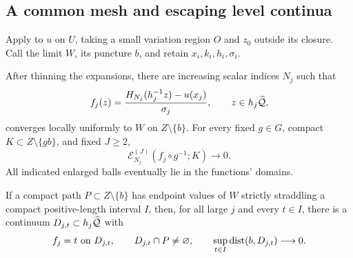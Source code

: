 \subsection{A common mesh and escaping level continua}

Apply  to $u$ on $U$, taking a small
variation region $O$ and $z_0$ outside its closure. Call the limit
$W$, its puncture $b$, and retain $x_i,k_i,h_i,\sigma_i$.

\begin{lemma}
\label{lem:exponential-diagonal}
After thinning the expansions, there are increasing scalar indices
$N_j$ such that
\[
 f_j(z)=\frac{H_{N_j}(h_j^{-1}z)-u(x_j)}{\sigma_j},
 \qquad z\in h_j\widehat{\mathcal Q},
\]
converges locally uniformly to $W$ on $Z\setminus\{b\}$.
For every fixed $g\in G$, compact $K\subset Z\setminus\{gb\}$,
and fixed $J\ge2$,
\begin{equation}
 \mathcal E_{N_j}^{(J)}(f_j\circ g^{-1};K)\longrightarrow0.
 \label{eq:exponential-translated-energy}
\end{equation}
All indicated enlarged balls eventually lie in the functions' domains.

If a compact path $P\subset Z\setminus\{b\}$ has endpoint values
of $W$ strictly straddling a compact positive-length interval $I$,
then, for all large $j$ and every $t\in I$, there is a continuum
$D_{j,t}\subset h_j\widehat{\mathcal Q}$ with
\[
 f_j=t\text{ on }D_{j,t},\qquad D_{j,t}\cap P\ne\varnothing,
 \qquad \sup_{t\in I}\operatorname{dist}(b,D_{j,t})\longrightarrow0.
\]
\end{lemma}

